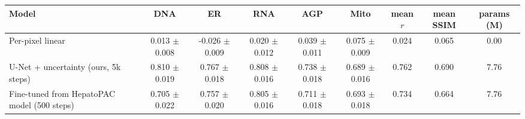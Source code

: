 \begin{tabular}{lcccccccc}
\toprule
Model & DNA & ER & RNA & AGP & Mito & mean $r$ & mean SSIM & params (M) \\
\midrule
Per-pixel linear & 0.013 $\pm$ 0.008 & -0.026 $\pm$ 0.009 & 0.020 $\pm$ 0.012 & 0.039 $\pm$ 0.011 & 0.075 $\pm$ 0.009 & 0.024 & 0.065 & 0.00 \\
U-Net + uncertainty (ours, 5k steps) & 0.810 $\pm$ 0.019 & 0.767 $\pm$ 0.018 & 0.808 $\pm$ 0.016 & 0.738 $\pm$ 0.018 & 0.689 $\pm$ 0.016 & 0.762 & 0.690 & 7.76 \\
Fine-tuned from HepatoPAC model (500 steps) & 0.705 $\pm$ 0.022 & 0.757 $\pm$ 0.020 & 0.805 $\pm$ 0.016 & 0.711 $\pm$ 0.018 & 0.693 $\pm$ 0.018 & 0.734 & 0.664 & 7.76 \\
\bottomrule
\end{tabular}
